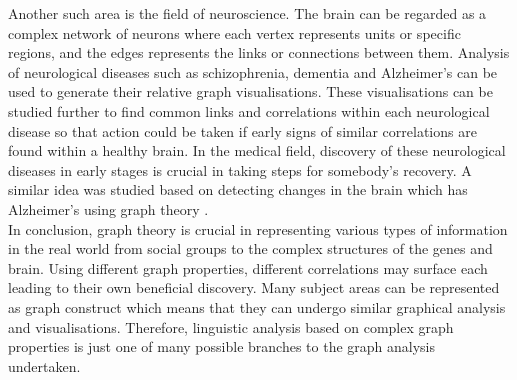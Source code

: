 Another such area is the field of neuroscience. The brain \cite{de2014graph} can be regarded as a complex network of neurons where each vertex represents units or specific regions, and the edges represents the links or connections between them. Analysis of neurological diseases such as schizophrenia, dementia and Alzheimer's can be used to generate their relative graph visualisations. These visualisations can be studied further to find common links and correlations within each neurological disease so that action could be taken if early signs of similar correlations are found within a healthy brain. In the medical field, discovery of these neurological diseases in early stages is crucial in taking steps for somebody's recovery. A similar idea was studied based on detecting changes in the brain which has Alzheimer's using graph theory \cite{10.1093/braincomms/fcaa129}.\\


\noindent In conclusion, graph theory is crucial in representing various types of information in the real world from social groups to the complex structures of the genes and brain. Using different graph properties, different correlations may surface each leading to their own beneficial discovery. Many subject areas can be represented as graph construct which means that they can undergo similar graphical analysis and visualisations. Therefore, linguistic analysis based on complex graph properties is just one of many possible branches to the graph analysis undertaken.